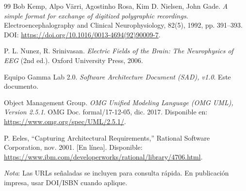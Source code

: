 \documentclass[11pt,a4paper]{article}
\DeclareRobustCommand{\_}{\textunderscore\allowbreak}
\begin{document}
\begin{thebibliography}{99}
 Bob Kemp, Alpo V\"arri, Agostinho Rosa, Kim D. Nielsen, John Gade. \textit{A simple format for exchange of digitized polygraphic recordings}. Electroencephalography and Clinical Neurophysiology, 82(5), 1992, pp. 391--393. DOI: \url{https://doi.org/10.1016/0013-4694(92)90009-7}.

 P. L. Nunez, R. Srinivasan. \textit{Electric Fields of the Brain: The Neurophysics of EEG} (2nd ed.). Oxford University Press, 2006.

 Equipo Gamma Lab 2.0. \textit{Software Architecture Document (SAD), v1.0}. Este documento.

 Object Management Group. \textit{OMG Unified Modeling Language (OMG UML), Version 2.5.1}. OMG Doc. formal/17-12-05, dic. 2017. Disponible en: \url{https://www.omg.org/spec/UML/2.5.1/}.

 P. Eeles, ``Capturing Architectural Requirements,'' Rational Software Corporation, nov. 2001. [En línea]. Disponible: \url{https://www.ibm.com/developerworks/rational/library/4706.html}.

\end{thebibliography}

\vspace{0.5cm}
\noindent\textit{Nota}: Las URLs se\~naladas se incluyen para consulta r\'apida. En publicaci\'on impresa, usar DOI/ISBN cuando aplique.
\end{document}
